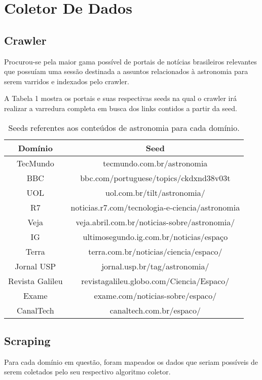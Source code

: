
\section{Coletor De Dados}

\subsection{Crawler}
Procurou-se pela maior gama possível de portais de notícias brasileiros relevantes que possuíam uma sessão destinada a assuntos relacionados à astronomia para serem varridos e indexados pelo crawler.

A Tabela 1 mostra os portais e suas respectivas seeds na qual o crawler irá realizar a varredura completa em busca dos links contidos a partir da seed.


\begin{table}[H]
\begin{tabular}{|c|c|}
\hline
Domínio & Seed\\\hline
TecMundo & tecmundo.com.br/astronomia \\\hline
BBC & bbc.com/portuguese/topics/ckdxnd38v03t\\\hline
UOL & uol.com.br/tilt/astronomia/\\\hline
R7 & noticias.r7.com/tecnologia-e-ciencia/astronomia \\\hline
Veja & veja.abril.com.br/noticias-sobre/astronomia/ \\\hline
IG & ultimosegundo.ig.com.br/noticias/espaço \\\hline
Terra & terra.com.br/noticias/ciencia/espaco/\\\hline
Jornal USP & jornal.usp.br/tag/astronomia/\\\hline
Revista Galileu & revistagalileu.globo.com/Ciencia/Espaco/\\\hline
Exame & exame.com/noticias-sobre/espaco/\\\hline
CanalTech & canaltech.com.br/espaco/\\\hline
\end{tabular}
\caption{Seeds referentes aos conteúdos de astronomia para cada domínio.}
\end{table}


\subsection{Scraping}
Para cada domínio em questão, foram mapeados os dados que seriam possíveis de serem coletados pelo seu respectivo algoritmo coletor.
 
